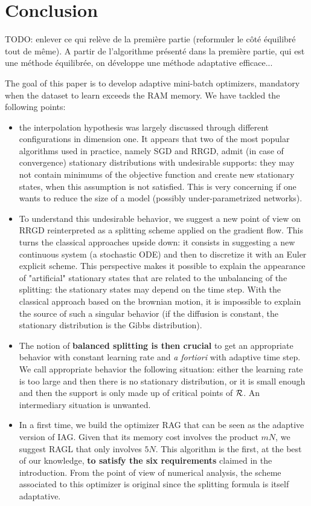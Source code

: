 \section{Conclusion}
\label{section_conclusion}

TODO: enlever ce qui relève de la première partie (reformuler le côté équilibré tout de même).
A partir de l'algorithme présenté dans la première partie, qui est une méthode équilibrée, on développe une méthode adaptative efficace...

The goal of this paper is to develop adaptive mini-batch optimizers, mandatory when the dataset to learn exceeds the RAM memory. We have tackled the following points:
\begin{itemize}
	\item the interpolation hypothesis was largely discussed through different configurations in dimension one. It appears that two of the most popular algorithms used in practice, namely SGD and RRGD, admit (in case of convergence) stationary distributions with undesirable supports: they may not contain minimums of the objective function and create new stationary states, when this assumption is not satisfied. This is very concerning if one wants to reduce the size of a model (possibly under-parametrized networks).
	\item To understand this undesirable behavior, we suggest a new point of view on RRGD reinterpreted as a splitting scheme applied on the gradient flow. This turns the
          classical approaches upside down: it consists in suggesting a new continuous system (a stochastic ODE) and then to discretize it with an Euler explicit scheme. This perspective makes it possible to explain the appearance of "artificial" stationary states that are related to the unbalancing of the splitting: the stationary states may depend on the time step. With the classical approach based on the brownian motion, it is impossible to explain the source of such a singular behavior (if the diffusion is constant, the stationary distribution is the Gibbs distribution).
        \item The notion of \textbf{balanced splitting is then crucial} to get an appropriate behavior with constant learning rate and {\em a fortiori} with adaptive time step. We call appropriate behavior the following situation: either the learning rate is too large and then there is no stationary distribution, or it is small enough and then the support is only made up of critical points of $\mathcal{R}$. An intermediary situation is unwanted.
	\item In a first time, we build the optimizer RAG that can be seen as the adaptive version of IAG. Given that its memory cost involves the product $mN$, we suggest RAGL that only involves $5N$. This algorithm is the first, at the best of our knowledge, \textbf{to satisfy the six requirements} claimed in the introduction. From the point of view of numerical analysis, the scheme associated to this optimizer is original since the splitting formula is itself adaptative.

\end{itemize}
